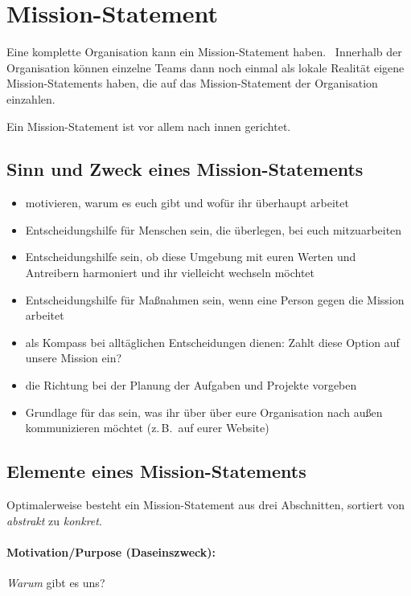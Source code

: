 \section{Mission-Statement}
\label{mission-statement}

Eine komplette Organisation kann ein Mission-Statement haben.~\cite{corporate-purpose} Innerhalb der Organisation können einzelne Teams dann noch einmal als \glqq lokale Realität\grqq{} eigene Mission-Statements haben, die auf das Mission-Statement der Organisation einzahlen.

Ein Mission-Statement ist vor allem nach innen gerichtet.

\subsection{Sinn und Zweck eines Mission-Statements}

\begin{itemize}
    \item motivieren, warum es euch gibt und wofür ihr überhaupt arbeitet
    \item Entscheidungshilfe für Menschen sein, die überlegen, bei euch mitzuarbeiten
    \item Entscheidungshilfe sein, ob diese Umgebung mit euren Werten und Antreibern harmoniert und ihr vielleicht wechseln möchtet
    \item Entscheidungshilfe für Maßnahmen sein, wenn eine Person gegen die Mission arbeitet
    \item als Kompass bei alltäglichen Entscheidungen dienen: \glqq Zahlt diese Option auf unsere Mission ein?\grqq
    \item die Richtung bei der Planung der Aufgaben und Projekte vorgeben
    \item Grundlage für das sein, was ihr über über eure Organisation nach außen kommunizieren möchtet (z.\,B.~auf eurer Website)
\end{itemize}

\subsection{Elemente eines Mission-Statements}

Optimalerweise besteht ein Mission-Statement aus drei Abschnitten, sortiert von \emph{abstrakt} zu \emph{konkret}.

\paragraph{Motivation/Purpose (Daseinszweck):} \emph{Warum} gibt es uns?

